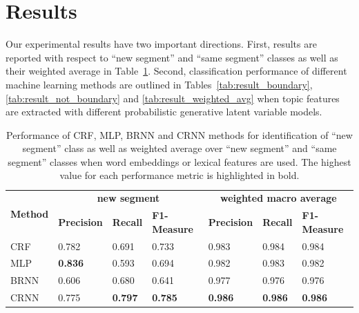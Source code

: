 \documentclass{amia}
\begin{document}
\section*{Results}
Our experimental results have two important directions. First, results are reported with respect to ``new segment'' and ``same segment'' classes as well as their weighted average in Table~\ref{tab:result_base}. Second, classification performance of different machine learning methods are outlined in Tables~\ref{tab:result_boundary}, \ref{tab:result_not_boundary} and \ref{tab:result_weighted_avg} when topic features are extracted with different probabilistic generative latent variable models.\\

\begin{table}[ht]
\centering
\caption{Performance of CRF, MLP, BRNN and CRNN methods for identification of ``new segment'' class as well as weighted average over ``new segment'' and ``same segment'' classes when word embeddings or lexical features are used. The highest value for each performance metric
is highlighted in bold.}
\label{tab:result_base}
  \begin{tabular}{|l|l|l|l|l|l|l|}
  \hline
   \multirow{2}{*}{\textbf{Method}} & \multicolumn{3}{|c|}{\textbf{new segment}} & \multicolumn{3}{|c|}{\textbf{weighted macro average}} \\\cline{2-7}
   & \textbf{Precision}  & \textbf{Recall} & \textbf{F1-Measure} & \textbf{Precision}  & \textbf{Recall} & \textbf{F1-Measure} \\ \hline    
 CRF & 0.782 & 0.691 & 0.733 & 0.983 & 0.984 & 0.984 \\ \hline
 MLP & \textbf{0.836} & 0.593 & 0.694 & 0.982 & 0.983 & 0.982 \\ \hline
 BRNN & 0.606 & 0.680 & 0.641 & 0.977 & 0.976 & 0.976 \\ \hline
 CRNN & 0.775 & \textbf{0.797} & \textbf{0.785} & \textbf{0.986} & \textbf{0.986} & \textbf{0.986} \\ \hline
  \end{tabular}
\end{table}                         
\end{document}
